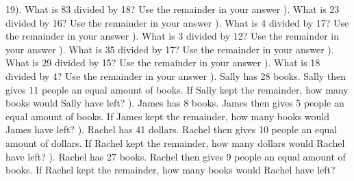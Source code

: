\documentclass{article}%
\begin{document}
19). What is 83 divided by 18? Use the remainder in your answer%
\newline%
\newline%
). What is 23 divided by 16? Use the remainder in your answer%
\newline%
\newline%
). What is 4 divided by 17? Use the remainder in your answer%
\newline%
\newline%
). What is 3 divided by 12? Use the remainder in your answer%
\newline%
\newline%
). What is 35 divided by 17? Use the remainder in your answer%
\newline%
\newline%
). What is 29 divided by 15? Use the remainder in your answer%
\newline%
\newline%
). What is 18 divided by 4? Use the remainder in your answer%
\newline%
\newline%
). Sally has 28 books. Sally then gives 11 people an equal amount of books. If Sally kept the remainder, how many books would Sally have left?%
\newline%
\newline%
). James has 8 books. James then gives 5 people an equal amount of books. If James kept the remainder, how many books would James have left?%
\newline%
\newline%
). Rachel has 41 dollars. Rachel then gives 10 people an equal amount of dollars. If Rachel kept the remainder, how many dollars would Rachel have left?%
\newline%
\newline%
). Rachel has 27 books. Rachel then gives 9 people an equal amount of books. If Rachel kept the remainder, how many books would Rachel have left?%
\newline%
\newline%
\end{document}
